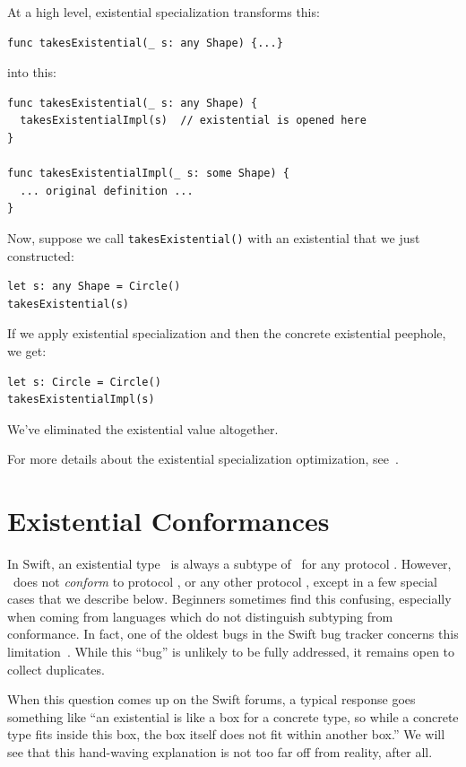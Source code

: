 \documentclass[../generics]{subfiles}
\begin{document}
\begin{example}
At a high level, existential specialization transforms this:
\begin{Verbatim}
func takesExistential(_ s: any Shape) {...}
\end{Verbatim}
into this:
\begin{Verbatim}
func takesExistential(_ s: any Shape) {
  takesExistentialImpl(s)  // existential is opened here
}

func takesExistentialImpl(_ s: some Shape) {
  ... original definition ...
}
\end{Verbatim}
Now, suppose we call \texttt{takesExistential()} with an existential that we just constructed:
\begin{Verbatim}
let s: any Shape = Circle()
takesExistential(s)
\end{Verbatim}
If we apply existential specialization and then the concrete existential peephole, we get:
\begin{Verbatim}
let s: Circle = Circle()
takesExistentialImpl(s)
\end{Verbatim}
We've eliminated the existential value altogether.
\end{example}

\pagebreak

For more details about the existential specialization optimization, see~\cite{rajexistential}.

\section{Existential Conformances}\label{sec:existential conformances}

In Swift, an existential type \AnyP\ is always a subtype of \AnyP\ for any protocol \tP. However, \AnyP\ does not \emph{conform} to protocol \tP, or any other protocol \tQ, except in a few special cases that we describe below. Beginners sometimes find this confusing, especially when coming from languages which do not distinguish subtyping from conformance. In fact, one of the oldest bugs in the Swift bug tracker concerns this limitation~\cite{sr55}. While this ``bug'' is unlikely to be fully addressed, it remains open to collect duplicates.

When this question comes up on the Swift forums, a typical response goes something like ``an existential is like a box for a concrete type, so while a concrete type fits inside this box, the box itself does not fit within another box.'' We will see that this hand-waving explanation is not too far off from reality, after all.
\end{document}
